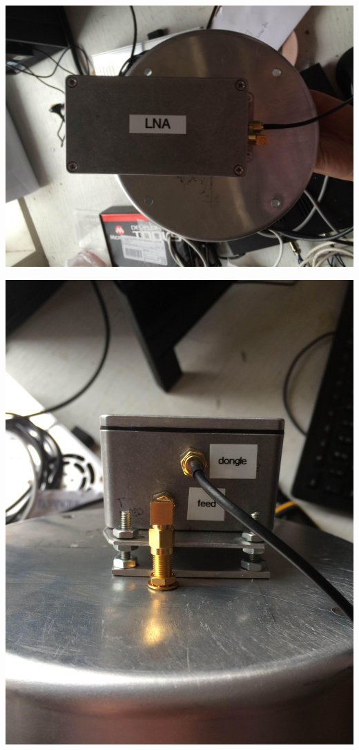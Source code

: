 \documentclass[11pt]{article} %
\begin{document}
\begin{center}
\includegraphics[scale=0.08]{feed/19.jpeg}
\end{center}

\begin{center}
\includegraphics[scale=0.08]{feed/20.jpeg}
\end{center}
\end{document}
